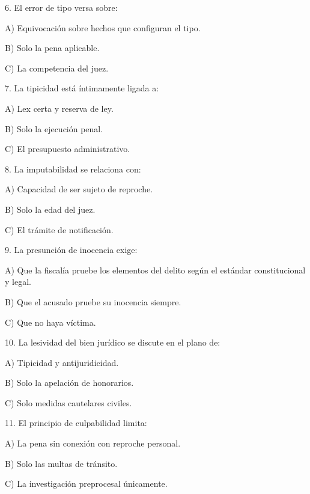 \documentclass[11pt,a4paper]{article}
\begin{document}
      6. El error de tipo versa sobre:\par

         A) Equivocación sobre hechos que configuran el tipo.\par
         B) Solo la pena aplicable.\par
         C) La competencia del juez.\par


      7. La tipicidad está íntimamente ligada a:\par

         A) Lex certa y reserva de ley.\par
         B) Solo la ejecución penal.\par
         C) El presupuesto administrativo.\par


      8. La imputabilidad se relaciona con:\par

         A) Capacidad de ser sujeto de reproche.\par
         B) Solo la edad del juez.\par
         C) El trámite de notificación.\par


      9. La presunción de inocencia exige:\par

         A) Que la fiscalía pruebe los elementos del delito según el estándar constitucional y legal.\par
         B) Que el acusado pruebe su inocencia siempre.\par
         C) Que no haya víctima.\par


      10. La lesividad del bien jurídico se discute en el plano de:\par

         A) Tipicidad y antijuridicidad.\par
         B) Solo la apelación de honorarios.\par
         C) Solo medidas cautelares civiles.\par


      11. El principio de culpabilidad limita:\par

         A) La pena sin conexión con reproche personal.\par
         B) Solo las multas de tránsito.\par
         C) La investigación preprocesal únicamente.\par
\end{document}
